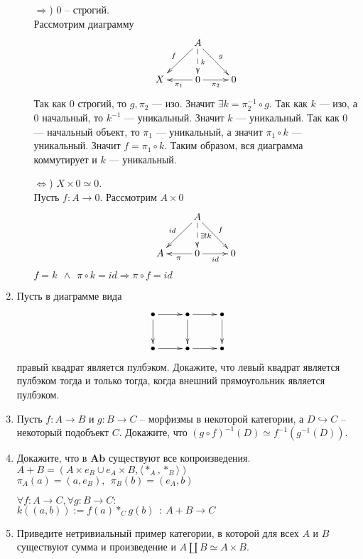 \documentclass[draft]{article}
\newcommand{\cat}[1]{\mathbf{#1}}
\newcommand{\Ab}{\cat{Ab}}
\begin{document}
\begin{enumerate}
\begin{itemize}
\item[$\Rightarrow$)] 0 -- строгий.\\
Рассмотрим диаграмму 
\[ \xymatrix{ 
& A \ar[dl]_f \ar[dr]^g \ar@{-->}[d]^k &\\
X & 0 \ar[l]^{\pi_1}\ar[r]_{\pi_2} & 0
} \]
Так как 0 строгий, то $g, \pi_2$ --- изо. Значит $\exists k = \pi_2^{-1} \circ g$. Так как $k$ --- изо, а 0 начальный, то $k^{-1}$ --- уникальный. Значит $k$ --- уникальный. Так как 0 --- начальный объект, то $\pi_1$ --- уникальный, а значит $\pi_1 \circ k$ --- уникальный. Значит $f = \pi_1 \circ k$. Таким образом, вся диаграмма коммутирует и $k$ --- уникальный.
\item[$\Leftrightarrow$)] $X\times 0 \simeq 0$.\\
Пусть $f : A \to 0$. Рассмотрим $A \times 0$
\[ \xymatrix{ 
& A \ar[dl]_{id} \ar[dr]^f \ar@{-->}[d]^{\exists!k} &\\
A & 0 \ar[l]^{\pi}\ar[r]_{id} & 0
} \]
$f = k ~~\land~~ \pi\circ k = id \Rightarrow \pi\circ f = id$

\end{itemize}


\item Пусть в диаграмме вида
\[ \xymatrix{ \bullet \ar[r] \ar[d] & \bullet \ar[r] \ar[d] & \bullet \ar[d] \\
              \bullet \ar[r]        & \bullet \ar[r]        & \bullet
            } \]
правый квадрат является пулбэком.
Докажите, что левый квадрат является пулбэком тогда и только тогда, когда внешний прямоугольник является пулбэком.

\item Пусть $f : A \to B$ и $g : B \to C$ -- морфизмы в некоторой категории, а $D \hookrightarrow C$ -- некоторый подобъект $C$.
Докажите, что $(g \circ f)^{-1}(D) \simeq f^{-1}(g^{-1}(D))$.

\item Докажите, что в $\Ab$ существуют все копроизведения.\\
$A+B = (A\times e_B \cup e_A\times B, \langle \ast_A, \ast_B\rangle)$\\
$\pi_A(a) = (a, e_B),~~\pi_B(b) = (e_A, b)$

$\forall f : A \to C, \forall g : B \to C:$\\
$k((a, b)) := f(a)\ast_C g(b) ~~:~A+B \to C$

\item Приведите нетривиальный пример категории, в которой для всех $A$ и $B$ существуют сумма и произведение и $A \amalg B \simeq A \times B$.


\end{enumerate}
\end{document}

